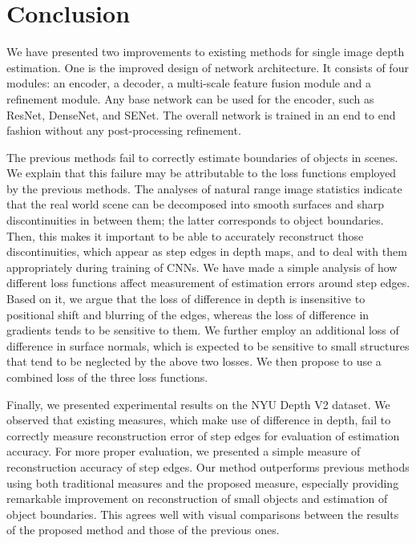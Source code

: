 \documentclass[10pt,twocolumn,letterpaper]{article}
\begin{document}
\section{Conclusion}






We have presented two improvements to existing methods for single image depth estimation. One is the improved design of network architecture. It consists of four modules: an encoder, a decoder, a multi-scale feature fusion module and a refinement module. Any base network can be used for the encoder,  such as ResNet, DenseNet, and SENet. The overall network is trained in an end to end
fashion without any post-processing refinement. 

The previous methods fail to correctly estimate boundaries of objects
in scenes. We explain that this failure may be attributable to the loss functions employed by the previous
methods. The analyses of natural range image statistics indicate that the real world scene can be decomposed into smooth surfaces and sharp discontinuities in between them; the latter
corresponds to object boundaries. Then, this makes it important to be able to accurately reconstruct those discontinuities, which appear as step edges in depth maps, and to deal
with them appropriately during training of CNNs. We have
made a simple analysis of how different loss functions affect
measurement of estimation errors around step edges. Based
on it, we argue that the loss of difference in depth is insensitive to positional shift and blurring of the edges, whereas the
loss of difference in gradients tends to be sensitive to them.
We further employ an additional loss of difference in surface
normals, which is expected to be sensitive to small structures
that tend to be neglected by the above two losses. We then
propose to use a combined loss of the three loss functions.

Finally, we presented experimental results on the NYU Depth V2 dataset. We observed that existing measures, which make use of difference
in depth, fail to correctly measure reconstruction
error of step edges for evaluation of estimation accuracy. For more proper evaluation, we presented a simple measure of reconstruction accuracy of step
edges. Our method outperforms previous methods using both
traditional measures and the proposed measure, especially providing
remarkable improvement on reconstruction of small objects and estimation of object boundaries. This agrees well with visual comparisons between the results of the proposed method and those of the previous ones.

{\small


}
\end{document}
